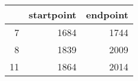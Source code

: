 % 
\begin{tabular}{rrr}
  \hline
 & startpoint & endpoint \\ 
  \hline
7 & 1684 & 1744 \\ 
  8 & 1839 & 2009 \\ 
  11 & 1864 & 2014 \\ 
   \hline
\end{tabular}
